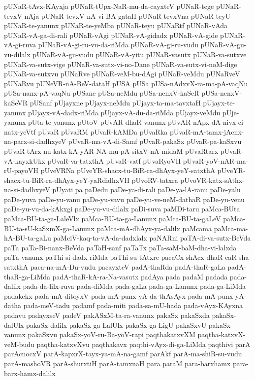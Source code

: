 {pUNaR-tAvx-KAyxja
pUNaR-tUpx-NaR-mu-da-cayxteV
pUNaR-tege
pUNaR-tevxV-nAja
pUNaR-tevxV-nA-vi-BA-gataH
pUNaR-tevxVna
pUNaR-teyU
pUNaR-te-yanunx
pUNaR-te-yeMba
pUNaR-teyu
pUNaRtf
pUNaR-vAda
pUNaR-vA-ga-di-rali
pUNaR-vAgi
pUNaR-vA-gidadx
pUNaR-vA-gide
pUNaR-vA-gi-ruva
pUNaR-vA-gi-ru-vu-da-riMda
pUNaR-vA-gi-ru-vudu
pUNaR-vA-gu-vu-dilalx
pUNaR-vA-gu-vudu
pUNaR-vA-yitu
pUNaR-vasutx
pUNaR-va-sutxve
pUNaR-va-sutx-vige
pUNaR-va-sutx-vi-no-Dane
pUNaR-va-sutx-vi-noM-dige
pUNaR-va-sutxvu
pUNaRve
pUNaR-veM-bu-dAgi
pUNaR-veMdu
pUNaRveV
pUNaRvu
pUNeVR-nA-BeV-dataH
pUSA
pUSa
pUSa-nAdxvX-ra-ma-pA-vaqNu
pUSa-nanx-pA-vaqNu
pUSane
pUSa-neMdu
pUSa-nenxV-kaSeR
pUSa-nenxV-kaSeVR
pUSanf
pUjayxne
pUjayx-neMdu
pUjayx-ta-ma-tavxtaH
pUjayx-te-yanunx
pUjayx-vA-dadx-riMda
pUjayx-vA-du-da-riMda
pUjayx-veMdu
pUje-yanunx
pUta-te-yanunx
pUtoV
pUvAR-dhaR-vanunx
pUvAR-nApx-dA-nivx-ci-natx-yeVtf
pUvaR
pUvaRM
pUvaR-kAMDa
pUvaRka
pUvaR-mA-tamx-jAcnx-na-parx-si-dadhxyeV
pUvaR-ma-vA-di-Samf
pUvaR-pakaSx
pUvaR-pa-kaSxvu
pUvaR-tArx-nu-katx-kA-yAR-NA-mu-pA-sitxV-nA-midaM
pUvaRtarx
pUvaR-vA-kayxkUkx
pUvaR-va-tatxthA
pUvaR-vatf
pUvaRyoVH
pUvaR-yoV-nAR-ma-rU-payoVH
pUveVRNa
pUveYR-shacx-tu-BiR-ra-dhAyx-yeY-satxthA
pUveYR-shacx-tu-BiR-ra-dhAyx-yeY-yaRdidhxVH
pUvoRV-tatxra
pUvoVR-katx-sAthx-na-si-dadhxyeV
pUyati
pa
paDedu
paDe-ya-di-rali
paDe-ya-lA-ranu
paDe-yalu
paDe-yuva
paDe-yu-vanu
paDe-yu-vavu
paDe-yu-ve-neM-dathaR
paDe-yu-venu
paDe-yu-vu-da-kAkxgi
paDe-yu-vu-dilalx
paDi-suva
paMDi-taru
paMca-BUta
paMca-BU-ta-ga-LaleVlx
paMca-BU-ta-ga-Lanunx
paMca-BU-ta-gaLeV
paMca-BU-ta-sU-kaSxmX-ga-Lanunx
paMca-mA-dhAyx-ya-dalilx
paMcama
paMca-ma-hA-BU-ta-gaLu
paMciV-kaq-ta-vA-da-dadxlalx
paNARni
paTA-di-va-sutx-BeVda
paTa
paTa-Bi-nanx-BeVda
paTaH-sanf
paTaTx
paTa-saM-baM-dha-vi-lalxda
paTa-vanunx
paThi-si-dadx-riMda
paThi-su-tAtxre
pacaCx-shAcx-dhaR-caR-sha-satxthA
paca-na-mA-Du-vudu
pacayxteV
padA-thaRda
padA-thaR-gaLa
padA-thaR-ga-LiMda
padA-thaR-kA-ra-Na-vasutx
padAya
pada
padaM
padada
pada-dalilx
pada-da-lilx-ruva
pada-diMda
pada-gaLa
pada-ga-Lanunx
pada-ga-LiMda
padakekx
pada-mA-ditoyxV
pada-mA-punx-yA-da-thAsAyx
pada-mA-punx-yA-datha
pada-meV-tadu
padamf
pada-miti
pada-sa-mU-hada
pada-vAyx-KAyxna
padavu
padayxseV
padeV
pakASxM-ta-ra-vanunx
pakaSx
pakaSxda
pakaSx-dalUlx
pakaSx-dalilx
pakaSx-ga-LalUlx
pakaSx-ga-LigU
pakaSxvU
pakaSx-vanunx
pakaSxvu
pakaSx-yoV-ru-Ba-yoV-rapi
paqthakatxvXM
paqtha-katxvX-veM-budu
paqtha-katxvXvu
paqthakavx
paqthi-vAyx-di-ga-LiMda
paqthivi
parA
parAcnocxV
parA-kapxrX-tayx-ya-mA-na-gamf
parAkf
parA-ma-shiR-su-vudu
parA-mashoVR
parA-shurxtiH
parA-tamxnaH
para
paraM
para-barxhamx
para-barx-hamx-dalilx
}
